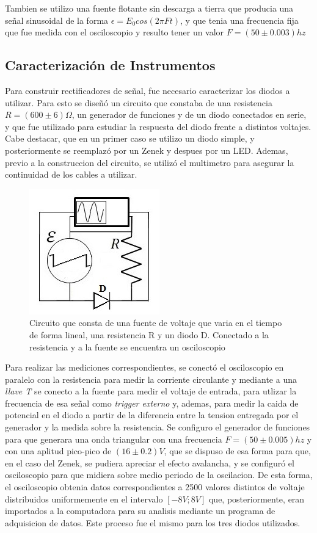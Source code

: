 \documentclass[11pt,a4paper]{article}
\begin{document}
Tambien se utilizo una fuente flotante sin descarga a tierra que producia una señal sinusoidal de la forma $\epsilon = E_{0}cos(2\pi Ft)$, y que tenia una frecuencia fija que fue medida con el osciloscopio y resulto tener un valor $F = (50 \pm 0.003)hz$


\subsection{Caracterización de Instrumentos}
Para construir rectificadores de señal, fue necesario caracterizar los diodos a utilizar. Para esto se diseñó un circuito que constaba de una resistencia \textbf{$R = (600 \pm 6)\Omega$}, un generador de funciones y de un diodo conectados en serie, y que fue utilizado para estudiar la respuesta del diodo frente a distintos voltajes. Cabe destacar, que en un primer caso se utilizo un diodo simple, y posteriormente se reemplazó por un Zenek y despues por un LED. Ademas, previo a la construccion del circuito, se utilizó el multimetro para asegurar la continuidad de los cables a utilizar.

\begin{figure}[H]
\centering
\includegraphics[scale=0.8]{Caracterizar-Diodo}
   \caption{Circuito que consta de una fuente de voltaje que varia en el tiempo de forma lineal, una resistencia R y un diodo D. Conectado a la resistencia y a la fuente se encuentra un osciloscopio}
   \label{fig:Car-Dio}
\end{figure}

Para realizar las mediciones correspondientes, se conectó el osciloscopio en paralelo con la resistencia para medir la corriente circulante y mediante a una \textit{llave T} se conecto a la fuente para medir el voltaje de entrada, para utlizar la frecuencia de esa señal como \textit{trigger externo} y, ademas, para medir la caida de potencial en el diodo a partir de la diferencia entre la tension entregada por el generador y la medida sobre la resistencia. Se configuro el generador de funciones para que generara una onda triangular con una frecuencia  $F = (50 \pm 0.005)hz$ y con una aplitud pico-pico de $(16 \pm 0.2)V$, que se dispuso de esa forma para que, en el caso del Zenek, se pudiera apreciar el efecto avalancha, y se configuró el osciloscopio para que midiera sobre medio periodo de la oscilacion. De esta forma, el osciloscopio obtenia datos correspondientes a 2500 valores distintos de voltaje distribuidos uniformemente en el intervalo $[-8V;8V]$ que, posteriormente, eran importados a la computadora para su analisis  mediante un programa de adquisicion de datos. Este proceso fue el mismo para los tres diodos utilizados.
\end{document}
